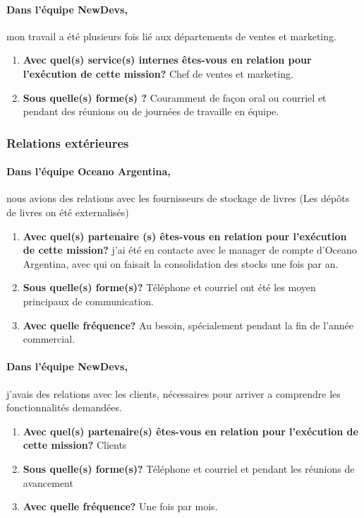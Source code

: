 \documentclass{resume} %
\begin{document}
		\paragraph{Dans l'équipe NewDevs,} mon travail a été plusieurs fois lié aux départements de ventes et marketing. 
		
		\begin{enumerate}
		\item \textbf{Avec quel(s) service(s) internes êtes-vous en relation pour l'exécution de cette mission?}
			Chef de ventes et marketing. 
		\item \textbf{Sous quelle(s) forme(s) ?}
			Couramment de façon oral ou courriel et pendant des réunions ou de journées de travaille en équipe.
		\end{enumerate}

	
	\subsubsection{Relations extérieures} 
		\paragraph{Dans l'équipe Oceano Argentina,} nous avions des relations avec les fournisseurs de stockage de livres (Les dépôts de livres on été externalisés)
		\begin{enumerate}
		\item \textbf{Avec quel(s) partenaire (s) êtes-vous en relation pour l'exécution de cette mission?}
			j'ai été en contacte avec le manager de compte d'Oceano Argentina, avec qui on faisait la consolidation des stocks une fois par an.
		\item \textbf{Sous quelle(s) forme(s)?}
			Téléphone et courriel ont été les moyen principaux de communication. 
		\item \textbf{Avec quelle fréquence?}
			Au besoin, spécialement pendant la fin de l'année commercial.
		\end {enumerate}			
		
		\paragraph{Dans l'équipe NewDevs,} j'avais des relations avec les clients, nécessaires pour arriver a comprendre les fonctionnalités demandées.   
		\begin{enumerate}
		\item \textbf{Avec quel(s) partenaire(s) êtes-vous en relation pour l'exécution de cette mission?}
			Clients
		\item \textbf{ Sous quelle(s) forme(s)?}
			Téléphone et courriel et pendant les réunions de avancement 
		\item \textbf{Avec quelle fréquence?}
			Une fois par mois.
		\end {enumerate}			
		
\end{document}

